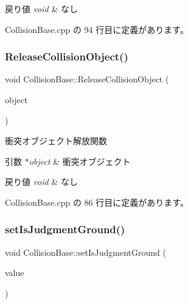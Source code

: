 \begin{DoxyRetVals}{戻り値}
{\em void} & なし \\
\hline
\end{DoxyRetVals}


 Collision\+Base.\+cpp の 94 行目に定義があります。

\mbox{\label{class_collision_base_ac962f33dd57509f41f750b5c7cb11d3b}} 
\subsubsection{\texorpdfstring{Release\+Collision\+Object()}{ReleaseCollisionObject()}}
{\footnotesize\ttfamily void Collision\+Base\+::\+Release\+Collision\+Object (\begin{DoxyParamCaption}\item[{\mbox{\hyperlink{class_collision_object}{Collision\+Object}} $\ast$}]{object }\end{DoxyParamCaption})}



衝突オブジェクト解放関数 


\begin{DoxyParams}{引数}
{\em $\ast$object} & 衝突オブジェクト \\
\hline
\end{DoxyParams}

\begin{DoxyRetVals}{戻り値}
{\em void} & なし \\
\hline
\end{DoxyRetVals}


 Collision\+Base.\+cpp の 86 行目に定義があります。

\mbox{\label{class_collision_base_a231cb5c715701444db63db030c06b694}} 
\subsubsection{\texorpdfstring{set\+Is\+Judgment\+Ground()}{setIsJudgmentGround()}}
{\footnotesize\ttfamily void Collision\+Base\+::set\+Is\+Judgment\+Ground (\begin{DoxyParamCaption}\item[{bool}]{value }\end{DoxyParamCaption})}




